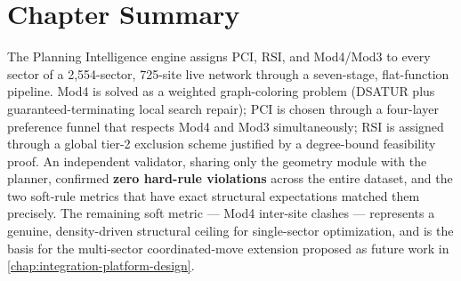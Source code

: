 \section{Chapter Summary}
\label{sec:pi-summary}

The Planning Intelligence engine assigns PCI, RSI, and Mod4/Mod3 to every
sector of a 2{,}554-sector, 725-site live network through a seven-stage,
flat-function pipeline. Mod4 is solved as a weighted graph-coloring problem
(DSATUR plus guaranteed-terminating local search repair); PCI is chosen through
a four-layer preference funnel that respects Mod4 and Mod3 simultaneously; RSI
is assigned through a global tier-2 exclusion scheme justified by a
degree-bound feasibility proof. An independent validator, sharing only the
geometry module with the planner, confirmed \textbf{zero hard-rule violations}
across the entire dataset, and the two soft-rule metrics that have exact
structural expectations matched them precisely. The remaining soft metric ---
Mod4 inter-site clashes --- represents a genuine, density-driven structural
ceiling for single-sector optimization, and is the basis for the multi-sector
coordinated-move extension proposed as future work in
\cref{chap:integration-platform-design}.
